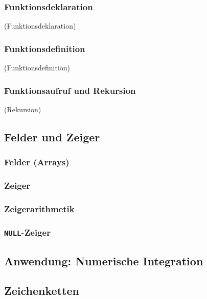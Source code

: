 \subsubsection{Funktionsdeklaration}
\iflecturer
\begin{framed}
  \slide{} (Funktionsdeklaration)
\end{framed}
\fi

\subsubsection{Funktionsdefinition}
\iflecturer
\begin{framed}
  \slide{} (Funktionsdefinition)
\end{framed}
\fi

\subsubsection{Funktionsaufruf und Rekursion}
\iflecturer
\begin{framed}
  \slide{} (Rekursion)
\end{framed}
\fi

\subsection{Felder und Zeiger}
\iflecturer
\begin{framed}
  
  \slide{}
  \blackboard{}
\end{framed}
\fi

\subsubsection{Felder (Arrays)}

\subsubsection{Zeiger}

\subsubsection{Zeigerarithmetik}

\subsubsection{\texttt{NULL}-Zeiger}

\subsection{Anwendung: Numerische Integration}

\iflecturer
\begin{framed}
\end{framed}
\fi

\subsection{Zeichenketten}

\iflecturer
\begin{framed}
\end{framed}
\fi
